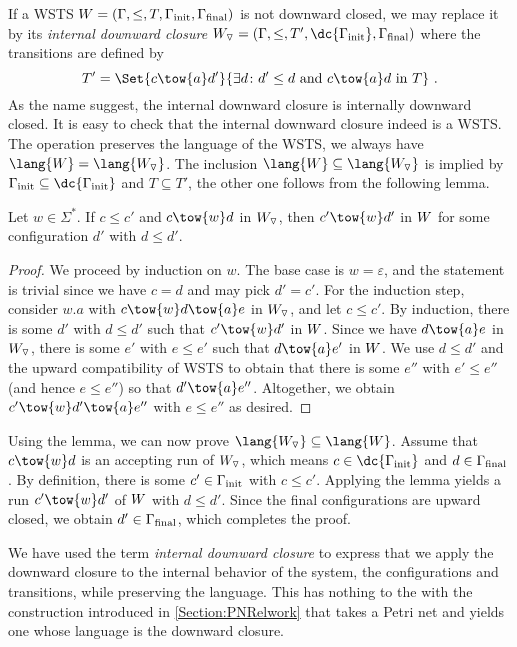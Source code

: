 \documentclass[../../diss.tex]{subfiles}
\begin{document}
If a WSTS $W = (\Gamma,\leq,T,\Gamma_{\text{init}},\Gamma_{\text{final}})$ is not downward closed, we may replace it by its \emph{internal downward closure} $\idc{\wsts} = (\configs,\leq,T',\dc{\configs_\init},\configs_\final)$ where the transitions are defined by
\[
    T' = \Set{ c \tow{a} d' }{ \exists d \colon d' \leq d \text{ and } c \tow{a} d \text{ in } T}
    \ .
\]
As the name suggest, the internal downward closure is internally downward closed.
It is easy to check that the internal downward closure indeed is a WSTS.\@
The operation preserves the language of the WSTS, \ie we always have $\lang{\wsts} = \lang{\idc{\wsts}}$.
The inclusion $\lang{\wsts} \subseteq \lang{\idc{\wsts}}$ is implied by $\configs_\init \subseteq \dc{\configs_\init}$ and $T \subseteq T'$, the other one follows from the following lemma.

\begin{lemma}%
\label{Lemma:WSTSExtendedCompatibility}%
    Let $w \in \Sigma^*$.
    If $c \leq c'$ and $c \tow{w} d$ in $W_{\scriptstyle{\triangledown}}$, then $c' \tow{w} d'$ in $W$ for some configuration $d'$ with $d \leq d'$.
\end{lemma}

\begin{proof}
    We proceed by induction on $w$.
    The base case is $w = \varepsilon$, and the statement is trivial since we have $c = d$ and may pick $d' = c'$.
    For the induction step, consider $w.a$ with $c \tow{w} d \tow{a} e$ in $W_{\scriptstyle{\triangledown}}$, and let $c \leq c'$.
    By induction, there is some $d'$ with $d \leq d'$ such that $c' \tow{w} d'$ in $W$.
    Since we have $d \tow{a} e$ in $W_{\scriptstyle{\triangledown}}$, there is some $e'$ with $e \leq e'$ such that $d \tow{a} e'$ in $W$.
    We use $d \leq d'$ and the upward compatibility of WSTS to obtain that there is some $e''$ with $e' \leq e''$ (and hence $e \leq e''$) so that $d' \tow{a} e''$.
    Altogether, we obtain $c' \tow{w} d' \tow{a} e''$ with $e \leq e''$ as desired.
\end{proof}

Using the lemma, we can now prove $\lang{\idc{\wsts}} \subseteq \lang{\wsts}$.
Assume that $c \tow{w} d$ is an accepting run of $W_{\scriptstyle{\triangledown}}$, which means $c \in \dc{\configs_\init}$ and $d \in \Gamma_{\text{final}}$.
By definition, there is some $c' \in \Gamma_{\text{init}}$ with $c \leq c'$.
Applying the lemma yields a run $c' \tow{w} d'$ of $W$ with $d \leq d'$.
Since the final configurations are upward closed, we obtain $d' \in \Gamma_{\text{final}}$, which completes the proof.

\begin{remark*}
    We have used the term \emph{internal downward closure} to express that we apply the downward closure to the internal behavior of the system, \ie the configurations and transitions, while preserving the language.
    This has nothing to the with the construction introduced in \cref{Section:PNRelwork} that takes \eg a Petri net and yields one whose language is the downward closure.
\end{remark*}
\end{document}
